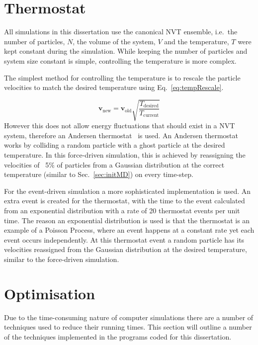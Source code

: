 \documentclass[12pt]{UoAthesis} \usepackage{booktabs}
\begin{document}
\section{Thermostat}

All simulations in this dissertation use the canonical NVT ensemble,
i.e.\ the number of particles, $N$, the volume of the system, $V$ and
the temperature, $T$ were kept constant during the simulation.  While
keeping the number of particles and system size constant is simple,
controlling the temperature is more complex.

The simplest method for controlling the temperature is to rescale the
particle velocities to match the desired temperature using
Eq.~\eqref{eq:tempRescale}.

\begin{equation}
  \label{eq:tempRescale}
  \mathbf{v}_{\text{new}} = \mathbf{v}_{\text{old}} \sqrt{\frac{T_{\text{desired}}}{T_{\text{current}}}}
\end{equation}
However this does not allow energy fluctuations that should exist in a
NVT system, therefore an Andersen thermostat~\cite{Andersen1980} is
used.  An Andersen thermostat works by colliding a random particle
with a ghost particle at the desired temperature.  In this
force-driven simulation, this is achieved by reassigning the
velocities of ~5\% of particles from a Gaussian distribution at the
correct temperature (similar to Sec.~\ref{sec:initMD}) on every time-step.

For the event-driven simulation a more sophisticated implementation is
used.  An extra event is created for the thermostat, with the time to
the event calculated from an exponential distribution with a rate of
20 thermostat events per unit time.  The reason an exponential
distribution is used is that the thermostat is an example of a Poisson
Process, where an event happens at a constant rate yet each event
occurs independently.  At this thermostat event a random particle has
its velocities reassigned from the Gaussian distribution at the
desired temperature, similar to the force-driven simulation.

\section{Optimisation \label{sec:Optimisation}}
Due to the time-consuming nature of computer simulations there are a
number of techniques used to reduce their running times.  This section
will outline a number of the techniques implemented in the programs
coded for this dissertation.
\end{document}
